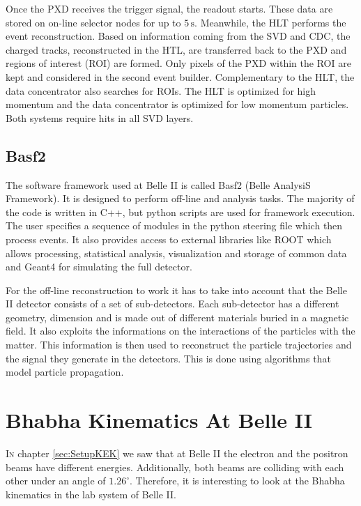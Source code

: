 \documentclass[a4paper,11pt,twosided,final,german,openbib,pdftex,listof=totoc,bibliography=totoc]{scrbook}
\begin{document}
Once the PXD receives the trigger signal, the readout starts. These data are stored on on-line selector nodes for up to $5\,\textrm{s}$. Meanwhile, the HLT performs the event reconstruction. Based on information coming from the SVD and CDC, the charged tracks, reconstructed in the HTL, are transferred back to the PXD and regions of interest (ROI) are formed. Only pixels of the PXD within the ROI are kept and considered in the second event builder. Complementary to the HLT, the data concentrator also searches for ROIs. The HLT is optimized for high momentum and the data concentrator is optimized for low momentum particles. Both systems require hits in all SVD layers. \cite{B2TR}


\section{Basf2}
\label{sec:Tools}

The software framework used at Belle II is called Basf2 (Belle AnalysiS Framework). It is designed to perform off-line and analysis tasks. The majority of the code is written in C++, but python scripts are used for framework execution. The user specifies a sequence of modules in the python steering file which then process events. It also provides access to external libraries like ROOT which allows processing, statistical analysis, visualization and storage of common data and Geant4 for simulating the full detector.\cite{Moll_2011}


For the off-line reconstruction to work it has to take into account that the Belle II detector consists of a set of sub-detectors. Each sub-detector has a different geometry, dimension and is made out of different materials buried in a magnetic field. It also exploits the informations on the interactions of the particles with the matter. This information is then used to reconstruct the particle trajectories and the signal they generate in the detectors. This is done using algorithms that model particle propagation.






\chapter{Bhabha Kinematics At Belle II}
\label{cha:Kinematics}

\lettrine{I}{n} chapter \ref{sec:SetupKEK} we saw that at Belle II the electron and the positron beams have different energies. Additionally, both beams are colliding with each other under an angle of $1.26^{\circ}$. Therefore, it is interesting to look at the Bhabha kinematics in the lab system of Belle II.
\end{document}
